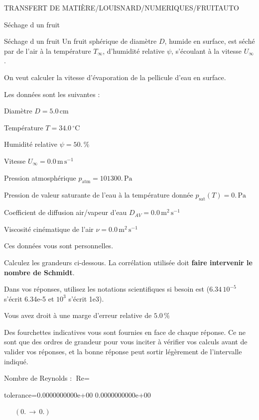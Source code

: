 \documentclass[12pt]{article}
\begin{document}
\begin{quiz}{TRANSFERT DE MATIÈRE/LOUISNARD/NUMERIQUES/FRUITAUTO}
\begin{cloze}{Séchage d un fruit}
\end{cloze} 


 \begin{cloze}{Séchage d un fruit} 
Un fruit sphérique de diamètre $D$, humide en surface, est séché par de l'air à la température $T_\infty$, d'humidité relative $\psi$, s'écoulant à la vitesse $U_\infty$.

On veut calculer la vitesse d'évaporation de la pellicule d'eau en surface.

 

Les données sont les suivantes :

 

Diamètre $D = 5.0\,  \mathrm{cm} $

Température $T = 34.0\,  \mathrm{^\circ\mathrm{C}} $

Humidité relative $\psi = 50.\, \% $

Vitesse $U_\infty = 0.0\,  \mathrm{m}\,  \mathrm{s}^{-1} $

Pression atmosphérique $p_{\text{atm}} = 101300.\,  \mathrm{Pa} $

Pression de valeur saturante de l’eau à la température donnée $p_{\text{sat}}(T) = 0.\,  \mathrm{Pa} $

Coefficient de diffusion air/vapeur d’eau $D_{AV} = 0.0\,  \mathrm{m}^{2}\,  \mathrm{s}^{-1} $

Viscosité cinématique de l’air $\nu = 0.0\,  \mathrm{m}^{2}\,  \mathrm{s}^{-1} $

Ces données vous sont personnelles.

 

Calculez les grandeurs ci-dessous. La corrélation utilisée doit \textbf{faire intervenir le nombre de Schmidt}.

Dans vos réponses, utilisez les notations scientifiques si besoin est ($6.34\, 10^{-5}$ s'écrit 6.34e-5 et $10^{3}$ s'écrit 1e3).

Vous avez droit à une marge d'erreur relative de $5.0\, \% $

Des fourchettes indicatives vous sont fournies en face de chaque réponse. Ce ne sont que des ordres de grandeur pour vous inciter à vérifier vos calculs avant de valider vos réponses, et la bonne réponse peut sortir légèrement de l'intervalle indiqué.

 

Nombre de Reynolds : $\text{Re} =  $
\begin{numerical}[points=1] 
\item[tolerance={0.0000000000e+00}] 0.0000000000e+00 
\end{numerical} 
 $\,$ 
 $ \quad (0. \, \rightarrow \, 0.) $ 


\end{cloze}
\end{quiz}
\end{document}
